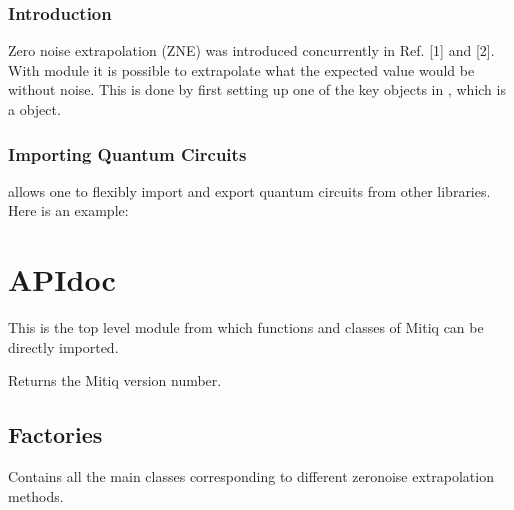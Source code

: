 \documentclass[letterpaper,10pt,english]{sphinxmanual}
\begin{document}
\subsection{Introduction}
\label{\detokenize{guide/guide-zne:introduction}}
Zero noise extrapolation (ZNE) was introduced concurrently in Ref. {[}1{]} and {[}2{]}.
With  module it is possible to extrapolate what the expected value would be without noise. This is done by first setting up one of the key objects in , which is a  object.


\subsection{Importing Quantum Circuits}
\label{\detokenize{guide/guide-zne:importing-quantum-circuits}}
 allows one to flexibly import and export quantum circuits from other libraries. Here is an example:

\begin{sphinxVerbatim}[commandchars=\\\{\}]
   
\end{sphinxVerbatim}


\chapter{API\sphinxhyphen{}doc}
\label{\detokenize{apidoc:module-mitiq}}\label{\detokenize{apidoc:api-doc}}\label{\detokenize{apidoc::doc}}
This is the top level module from which functions and classes of
Mitiq can be directly imported.

\begin{fulllineitems}
\label{\detokenize{apidoc:mitiq.version}}
Returns the Mitiq version number.

\end{fulllineitems}



\section{Factories}
\label{\detokenize{apidoc:module-mitiq.factories}}\label{\detokenize{apidoc:factories}}
Contains all the main classes corresponding to different zero\sphinxhyphen{}noise extrapolation methods.
\end{document}
